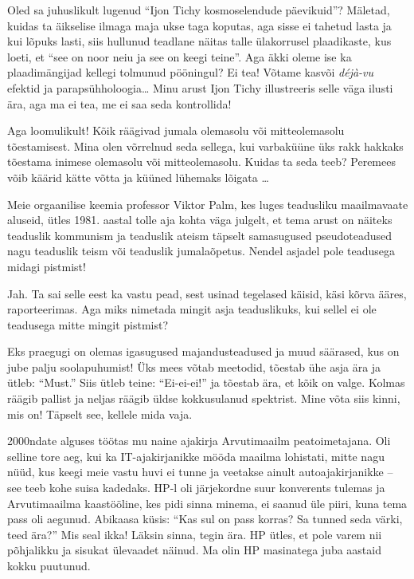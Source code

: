 Oled sa juhuslikult lugenud \enquote{Ijon Tichy kosmoselendude 
päevikuid}? Mäletad, 
kuidas ta äikselise ilmaga maja ukse taga koputas, aga sisse ei tahetud lasta ja kui 
lõpuks lasti, siis hullunud teadlane näitas talle ülakorrusel 
plaadikaste, kus loeti, et \enquote{see on noor neiu ja see on keegi teine}. 
Aga äkki oleme ise ka plaadimängijad kellegi tolmunud pööningul? Ei tea! Võtame kasvõi
\emph{déjà-vu} efektid ja parapsühholoogia\ldots{ }Minu arust Ijon Tichy illustreeris selle väga ilusti 
ära, aga ma ei tea, me ei saa seda kontrollida! 


Aga loomulikult! Kõik räägivad jumala olemasolu või
mitteolemasolu tõestamisest. Mina olen võrrelnud seda sellega, kui varbaküüne 
üks rakk hakkaks tõestama inimese olemasolu või mitteolemasolu. Kuidas ta seda 
teeb? Peremees võib käärid kätte võtta ja küüned lühemaks lõigata \ldots

Meie orgaanilise keemia professor Viktor Palm, kes
luges teadusliku maailmavaate aluseid, ütles 1981. aastal tolle aja kohta väga julgelt, et tema arust on näiteks teaduslik kommunism ja teaduslik 
ateism täpselt samasugused pseudoteadused nagu teaduslik teism või teaduslik 
jumalaõpetus. Nendel asjadel pole teadusega midagi pistmist!


Jah. Ta sai selle eest ka vastu pead, sest usinad tegelased käisid, käsi kõrva ääres, raporteerimas. Aga miks nimetada mingit asja 
teaduslikuks, kui sellel ei ole teadusega mitte mingit pistmist?


Eks praegugi on olemas igasugused majandusteadused ja muud säärased, kus on
jube palju soolapuhumist! Üks mees võtab meetodid, tõestab ühe 
asja ära ja ütleb: \enquote{Must.} Siis ütleb teine: \enquote{Ei-ei-ei!} ja tõestab 
ära, et kõik on valge. Kolmas räägib pallist ja neljas räägib üldse kokkusulanud spektrist. Mine võta siis kinni, mis on! Täpselt see, kellele mida vaja.


2000ndate alguses töötas mu naine ajakirja 
Arvutimaailm peatoimetajana. Oli selline tore aeg, kui 
ka IT-ajakirjanikke mööda maailma lohistati, mitte nagu nüüd, kus keegi meie 
vastu huvi ei tunne ja veetakse ainult autoajakirjanikke -- see teeb kohe suisa 
kadedaks. HP-l oli järjekordne suur konverents tulemas ja 
Arvutimaailma kaastööline, kes pidi sinna minema, ei saanud üle piiri, kuna tema pass oli aegunud. Abikaasa küsis: \enquote{Kas sul on pass korras? Sa tunned 
seda värki, teed ära?} Mis seal ikka! Läksin sinna, tegin ära. HP ütles, et pole varem nii
põhjalikku ja sisukat ülevaadet näinud. Ma olin HP masinatega 
juba aastaid kokku puutunud. 

